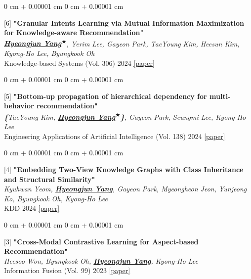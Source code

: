 \documentclass[10pt, letterpaper]{article}
\newenvironment{onecolentry}{
	\begin{adjustwidth}{
			0 cm + 0.00001 cm
		}{
			0 cm + 0.00001 cm
		}
	}{
	\end{adjustwidth}
} %
\begin{document}
\begin{samepage}
		\vspace{0.20 cm}
		\begin{onecolentry}
			[6] \textbf{"Granular Intents Learning via Mutual Information Maximization for Knowledge-aware Recommendation"}\\
			\textit{\textbf{\underline{Hyeongjun Yang\textsuperscript{$\bigstar$}}}, Yerim Lee, Gayeon Park, TaeYoung Kim, Heesun Kim, Kyong-Ho Lee, Byungkook Oh}\\
			\vspace{0.05 cm}
			Knowledge-based Systems (Vol. 306) 2024 \href{https://doi.org/10.1016/j.knosys.2024.112705}{[paper]}
		\end{onecolentry}	
			
		\vspace{0.20 cm}
		\begin{onecolentry}
			[5] \textbf{"Bottom-up propagation of hierarchical dependency for multi-behavior recommendation"}\\
			\textit{\textbf{\{}TaeYoung Kim, \textbf{\underline{Hyeongjun Yang\textsuperscript{$\bigstar$}}}\textbf{\}}, Gayeon Park, Seungmi Lee, Kyong-Ho Lee}\\
			\vspace{0.05 cm}
			Engineering Applications of Artificial Intelligence (Vol. 138) 2024 \href{https://www.sciencedirect.com/science/article/pii/S0952197624015227}{[paper]}
		\end{onecolentry}
		
		\vspace{0.20 cm}
		\begin{onecolentry}
			[4] \textbf{"Embedding Two-View Knowledge Graphs with Class Inheritance and Structural Similarity"}\\
			\textit{Kyuhwan Yeom, \textbf{\underline{Hyeongjun Yang}}, Gayeon Park, Myeongheon Jeon, Yunjeong Ko, Byungkook Oh, Kyong-Ho Lee}\\
			\vspace{0.05 cm}
			KDD 2024 \href{https://dl.acm.org/doi/10.1145/3637528.3671941}{[paper]}
		\end{onecolentry}
		
		\vspace{0.20 cm}
		\begin{onecolentry}
			[3] \textbf{"Cross-Modal Contrastive Learning for Aspect-based Recommendation"}\\
			\textit{Heesoo Won, Byungkook Oh, \textbf{\underline{Hyeongjun Yang}}, Kyong-Ho Lee}\\
			\vspace{0.05 cm}
			Information Fusion (Vol. 99) 2023 \href{https://www.sciencedirect.com/science/article/pii/S1566253523001744}{[paper]}
		\end{onecolentry}
		

\end{samepage}
\end{document}
